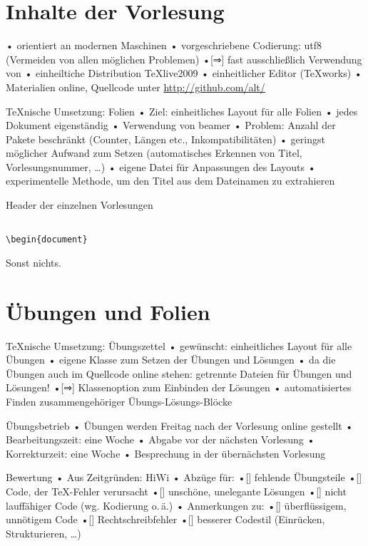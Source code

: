\documentclass[t]{beamer}
\begin{document}
\section{Inhalte der Vorlesung}
\begin{frame}[fragile]
• orientiert an modernen Maschinen
• vorgeschriebene Codierung: utf8 (Vermeiden von allen möglichen Problemen)
•[⇒] fast ausschließlich Verwendung von \XeTeX
• einheiltiche Distribution \TeX live2009
• einheitlicher Editor (\TeX works)
• Materialien online, Quellcode unter \url{http://github.com/alt/}
\•
\end{frame}

\begin{frame}{\TeX nische Umsetzung: Folien}
• Ziel: einheitliches Layout für alle Folien
• jedes Dokument eigenständig
• Verwendung von beamer
• Problem: Anzahl der Pakete beschränkt (Counter, Längen etc., Inkompatibilitäten)
• geringst möglicher Aufwand zum Setzen (automatisches Erkennen von Titel, Vorlesungsnummer, …)\pause
• eigene Datei für Anpassungen des Layouts
• experimentelle Methode, um den Titel aus dem Dateinamen zu extrahieren
\•
\end{frame}

\begin{frame}[fragile]{Header der einzelnen Vorlesungen}
\begin{verbatim}

\begin{document}
\end{verbatim}
Sonst nichts.
\end{frame}

\section{Übungen und Folien}
\begin{frame}{\TeX nische Umsetzung: Übungszettel}
• gewünscht: einheitliches Layout für alle Übungen
• eigene Klasse zum Setzen der Übungen und Lösungen
• da die Übungen auch im Quellcode online stehen: getrennte Dateien für Übungen und Lösungen!
•[⇒] Klassenoption zum Einbinden der Lösungen
• automatisiertes Finden zusammengehöriger Übungs-Lösungs-Blöcke
\•
\end{frame}

\begin{frame}{Übungsbetrieb}
• Übungen werden Freitag nach der Vorlesung online gestellt
• Bearbeitungszeit: eine Woche
• Abgabe vor der nächsten Vorlesung
• Korrekturzeit: eine Woche
• Besprechung in der übernächsten Vorlesung
\• 
\end{frame}

\begin{frame}{Bewertung}
• Aus Zeitgründen: HiWi
• Abzüge für:
•[] fehlende Übungsteile
•[] Code, der \TeX-Fehler verursacht
•[] unschöne, unelegante Lösungen
•[] nicht lauffähiger Code (wg. Kodierung o.\,ä.)
• Anmerkungen zu:
•[] überflüssigem, unnötigem Code
•[] Rechtschreibfehler
•[] besserer Codestil (Einrücken, Strukturieren, …) 
\•
\end{frame}
\end{document}
